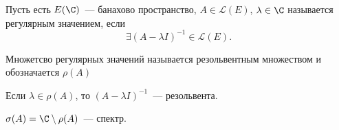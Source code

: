 \begin{definition}
    Пусть есть $E(\C)$~--- банахово пространство, $A \in \mathcal{L}(E)$, $\lambda \in \C$ называется регулярным значением, если
    \[
    \exists (A - \lambda I)^{-1} \in \mathcal{L}(E).
    \]

    Множетсво регулярных значений называется резольвентным множеством и обозначается $\rho (A)$
\end{definition}

\begin{definition}
    Если $\lambda \in \rho(A)$, то $(A - \lambda I)^{-1}$~--- резольвента.
\end{definition}

\begin{definition}
    $\sigma(A)=\C \setminus \rho(A)$~--- спектр.
\end{definition}